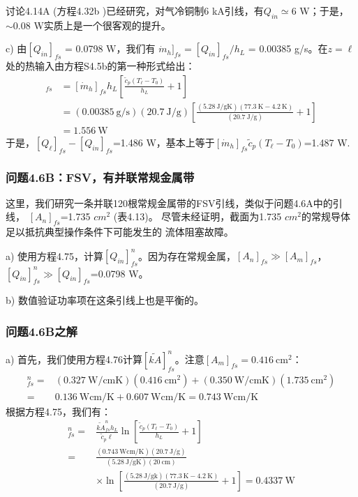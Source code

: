 讨论4.14A (方程4.32b )已经研究，对气冷铜制6 kA引线，有$Q_{in}\simeq$6 W；于是，
$\sim$0.08 W实质上是一个很客观的提升。

c) 由$[Q_{in}]_{fs}$ = 0.0798 W，我们有
$\dot{m}_h]_{fs}= [Q_{in}]_{fs}/h_L$ = 0.00385 g/s。在$z=\ell$处的热输入由方程S4.5b的第一种形式给出：
\begin{align*}
[Q_\ell]_{fs}&=[\dot{m}_h]_{fs}h_L\left[\frac{\tilde{c}_p(T_\ell-T_0)}{h_L}+1\right] \\
&=(0.00385\ \mathrm{g/s})(20.7\ \mathrm{J/g})\left[\frac{(5.28\ \mathrm{J/gK})(77.3\ \mathrm{K}-4.2\ \mathrm{K})}{(20.7\ \mathrm{J/g})}+1\right] \\
&=1.556\ \mathrm{W}
\end{align*}
于是，$[Q_\ell]_{fs}−[Q_{in}]_{fs}$=1.486 W，基本上等于$[\dot{m}_h]_{fs} \tilde{c}_p(T_\ell-T_0)$=1.487 W.

\subsubsection{问题4.6B：FSV，有并联常规金属带}
这里，我们研究一条并联120根常规金属带的FSV引线，类似于问题4.6A中的引线，
$[A_n]_{fs}$=1.735 $cm^2$ (表4.13)。
尽管未经证明，截面为1.735 $cm^2$的常规导体足以抵抗典型操作条件下可能发生的
流体阻塞故障。

a) 使用方程4.75，计算$[Q_{in}]_{fs}^n$。因为存在常规金属，$[A_n]_{fs}\gg [A_m]_{fs}$，
$[Q_{in}]_{fs}^n\gg[Q_{in}]_{fs}$=0.0798 W。

b) 数值验证功率项在这条引线上也是平衡的。

\subsubsection{问题4.6B之解}
a) 首先，我们使用方程4.76计算$[\tilde{kA}]_{fs}^{n}$。注意$[A_m]_{fs}=0.416\ \mathrm{cm^2}$：
\begin{align*}
[\tilde{kA}]_{fs}^{n}=&(0.327\ \mathrm{W/cm K})(0.416\ \mathrm{cm^2})+(0.350\ \mathrm{W/cmK})(1.735\ \mathrm{cm^2}) \\
=&0.136\ \mathrm{W cm/K}+0.607\ \mathrm{W cm/K}=0.743\ \mathrm{W cm/K}
\end{align*}
根据方程4.75，我们有：
\begin{align}%
[Q_{in}]_{fs}^{n}=&\frac{\tilde{kA}_{fs}^{n}h_L}{\tilde{c}_p\ell}\ln\left[\frac{\tilde{c}_p(T_\ell-T_0)}{h_L}+1\right] \\
=&\frac{(0.743\ \mathrm{W cm/K})(20.7\ \mathrm{J/g})}{(5.28\ \mathrm{J/gK})(20\ \mathrm{cm})} \\
&\times\ln\left[\frac{(5.28\ \mathrm{J/gk})(77.3\ \mathrm{K}-4.2\ \mathrm{K})}{(20.7\ \mathrm{J/g})}+1\right]=0.4337\ \mathrm{W}
\end{align}

